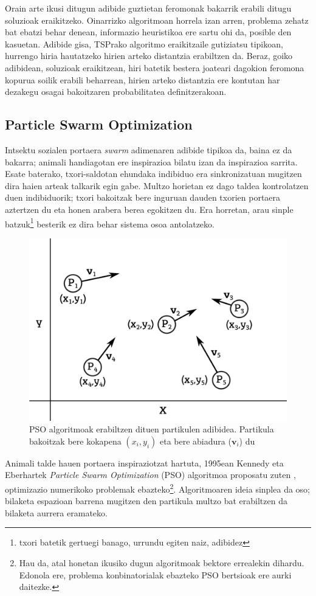 \documentclass[eu]{ifirak}\usepackage[]{graphicx}\usepackage[]{color}
\begin{document}
Orain arte ikusi ditugun adibide guztietan feromonak bakarrik erabili ditugu soluzioak eraikitzeko. Oinarrizko algoritmoan horrela izan arren, problema zehatz bat ebatzi behar denean, informazio heuristikoa ere sartu ohi da, posible den kasuetan. Adibide gisa, TSPrako algoritmo eraikitzaile gutiziatsu tipikoan, hurrengo hiria hautatzeko hirien arteko distantzia erabiltzen da. Beraz, goiko adibidean, soluzioak eraikitzean, hiri batetik bestera joateari dagokion feromona kopurua soilik erabili beharrean,  hirien arteko distantzia ere kontutan har dezakegu osagai bakoitzaren probabilitatea definitzerakoan.


\subsection{Particle Swarm Optimization}

Intsektu sozialen portaera \textit{swarm} adimenaren adibide tipikoa da, baina ez da bakarra; animali handiagotan ere inspirazioa bilatu izan da inspirazioa sarrita. Esate baterako, txori-saldotan ehundaka indibiduo era sinkronizatuan mugitzen dira haien arteak talkarik egin gabe. Multzo horietan ez dago  taldea kontrolatzen duen indibiduorik; txori bakoitzak bere inguruan dauden txorien portaera aztertzen du eta honen arabera berea egokitzen du. Era horretan, arau sinple batzuk\footnote{txori batetik gertuegi banago, urrundu egiten naiz, adibidez} besterik ez dira behar sistema osoa antolatzeko.

\begin{figure}[t]
\centering
\includegraphics[width=0.6\linewidth]{./Irudiak/PSO_1}
\caption{PSO algoritmoak erabiltzen dituen partikulen adibidea. Partikula bakoitzak bere kokapena $(x_i,y_i)$ eta bere abiadura ($\mathbf{v}_i$) du}\label{fig:PSO}
\end{figure}


Animali talde hauen portaera inspiraziotzat hartuta, 1995ean Kennedy eta Eberhartek \textit{Particle Swarm Optimization} (PSO) algoritmoa proposatu zuten \cite{kennedy1995}, optimizazio numerikoko problemak ebazteko\footnote{Hau da, atal honetan ikusiko dugun algoritmoak bektore errealekin dihardu. Edonola ere, problema konbinatorialak ebazteko PSO bertsioak ere aurki daitezke.}. Algoritmoaren ideia sinplea da oso; bilaketa espazioan barrena mugitzen den partikula multzo bat erabiltzen da bilaketa aurrera eramateko. 
\end{document}
